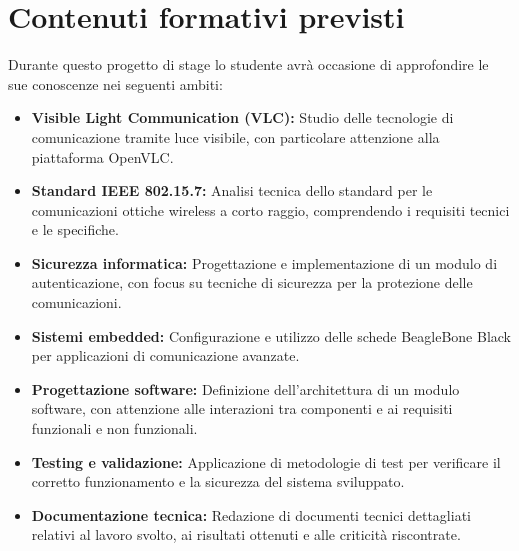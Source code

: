 \section*{Contenuti formativi previsti}
Durante questo progetto di stage lo studente avrà occasione di approfondire le sue conoscenze nei seguenti ambiti:
\begin{itemize}
    \item \textbf{Visible Light Communication (VLC):} Studio delle tecnologie di comunicazione tramite luce visibile, con particolare attenzione alla piattaforma OpenVLC.
    \item \textbf{Standard IEEE 802.15.7:} Analisi tecnica dello standard per le comunicazioni ottiche wireless a corto raggio, comprendendo i requisiti tecnici e le specifiche.
    \item \textbf{Sicurezza informatica:} Progettazione e implementazione di un modulo di autenticazione, con focus su tecniche di sicurezza per la protezione delle comunicazioni.
    \item \textbf{Sistemi embedded:} Configurazione e utilizzo delle schede BeagleBone Black per applicazioni di comunicazione avanzate.
    \item \textbf{Progettazione software:} Definizione dell'architettura di un modulo software, con attenzione alle interazioni tra componenti e ai requisiti funzionali e non funzionali.
    \item \textbf{Testing e validazione:} Applicazione di metodologie di test per verificare il corretto funzionamento e la sicurezza del sistema sviluppato.
    \item \textbf{Documentazione tecnica:} Redazione di documenti tecnici dettagliati relativi al lavoro svolto, ai risultati ottenuti e alle criticità riscontrate.
\end{itemize}
\newpage